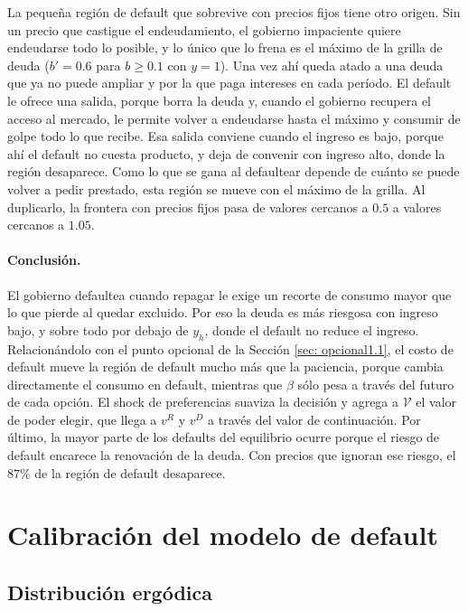 \documentclass[11pt,a4paper]{article}
\begin{document}
La pequeña región de default que sobrevive con precios fijos tiene otro origen. Sin un precio que castigue el endeudamiento, el gobierno impaciente quiere endeudarse todo lo posible, y lo único que lo frena es el máximo de la grilla de deuda ($b'=0.6$ para $b\geq0.1$ con $y=1$). Una vez ahí queda atado a una deuda que ya no puede ampliar y por la que paga intereses en cada período. El default le ofrece una salida, porque borra la deuda y, cuando el gobierno recupera el acceso al mercado, le permite volver a endeudarse hasta el máximo y consumir de golpe todo lo que recibe. Esa salida conviene cuando el ingreso es bajo, porque ahí el default no cuesta producto, y deja de convenir con ingreso alto, donde la región desaparece. Como lo que se gana al defaultear depende de cuánto se puede volver a pedir prestado, esta región se mueve con el máximo de la grilla. Al duplicarlo, la frontera con precios fijos pasa de valores cercanos a $0.5$ a valores cercanos a $1.05$.

\paragraph{Conclusión.} El gobierno defaultea cuando repagar le exige un recorte de consumo mayor que lo que pierde al quedar excluido. Por eso la deuda es más riesgosa con ingreso bajo, y sobre todo por debajo de $y_h$, donde el default no reduce el ingreso. Relacionándolo con el punto opcional de la Sección \ref{sec: opcional1.1}, el costo de default mueve la región de default mucho más que la paciencia, porque cambia directamente el consumo en default, mientras que $\beta$ sólo pesa a través del futuro de cada opción. El shock de preferencias suaviza la decisión y agrega a $\mathcal V$ el valor de poder elegir, que llega a $v^R$ y $v^D$ a través del valor de continuación. Por último, la mayor parte de los defaults del equilibrio ocurre porque el riesgo de default encarece la renovación de la deuda. Con precios que ignoran ese riesgo, el $87\%$ de la región de default desaparece.

\section{Calibración del modelo de default}
\label{sec:calibracion}

\subsection{Distribución ergódica}
\label{sec:ergodica}
\end{document}
